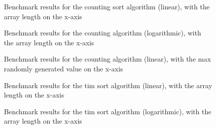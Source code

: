 \newpage



\begin{multicols}{2}

\begin{figure}[H]
  \centering
  
  \caption{Benchmark results for the counting sort algorithm (linear), with the array length on the x-axis}
\end{figure}

\begin{figure}[H]
  \centering
  
  \caption{Benchmark results for the counting algorithm (logarithmic), with the array length on the x-axis}
\end{figure}

\end{multicols}

\begin{multicols}{2}

\begin{figure}[H]
  \centering
  
  \caption{Benchmark results for the counting algorithm (linear), with the max randomly generated value on the x-axis}
\end{figure}

%  

\end{multicols}


\newpage



\begin{multicols}{2}

\begin{figure}[H]
  \centering
  
  \caption{Benchmark results for the tim sort algorithm (linear), with the array length on the x-axis}
\end{figure}

\begin{figure}[H]
  \centering
  
  \caption{Benchmark results for the tim sort algorithm (logarithmic), with the array length on the x-axis}
\end{figure}

\end{multicols}

